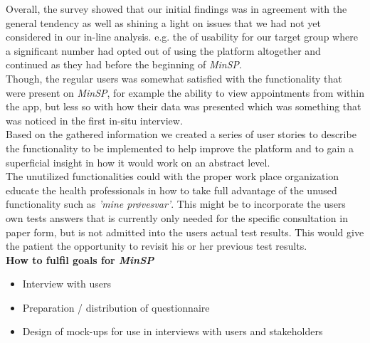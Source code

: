 \documentclass[a4paper,11pt]{article}
\begin{document}
Overall, the survey showed that our initial findings was in agreement with the general tendency as well as shining a light on issues that we had not yet considered in our in-line analysis. e.g. the of usability for our target group where a significant number had opted out of using the platform altogether and continued as they had before the beginning of \textit{MinSP}.\\

Though, the regular users was somewhat satisfied with the functionality that were present on \textit{MinSP}, for example the ability to view appointments from within the app, but less so with how their data was presented which was something that was noticed in the first in-situ interview.\\

Based on the gathered information we created a series of user stories to describe the functionality to be implemented to help improve the platform and to gain a superficial insight in how it would work on an abstract level.\\




 

The unutilized functionalities could with the proper work place organization educate the health professionals in how to take full advantage of the unused functionality such as \textit{'mine prøvesvar'}. This might be to incorporate the users own tests answers that is currently only needed for the specific consultation in paper form, but is not admitted into the users actual test results. This would give the patient the opportunity to revisit his or her previous test results.\\


\textbf{How to fulfil goals for \textit{MinSP}}
\begin{itemize}
    \item Interview with users
    \item Preparation / distribution of questionnaire
    \item Design of mock-ups for use in interviews with users and stakeholders
\end{itemize}
\end{document}
